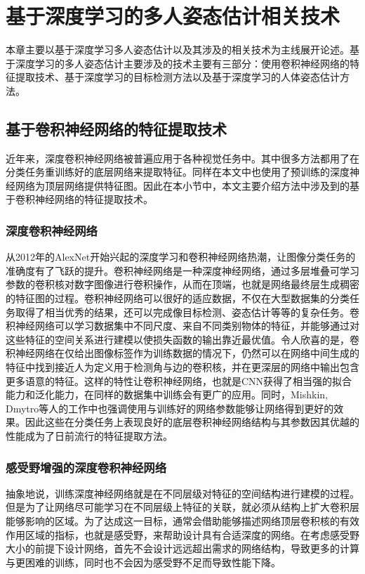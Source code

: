 \chapter{基于深度学习的多人姿态估计相关技术}
\label{cha:basicfacts}
本章主要以基于深度学习多人姿态估计以及其涉及的相关技术为主线展开论述。基于深度学习的多人姿态估计主要涉及的技术主要有三部分：使用卷积神经网络的特征提取技术、基于深度学习的目标检测方法以及基于深度学习的人体姿态估计方法。
\section{基于卷积神经网络的特征提取技术}
近年来，深度卷积神经网络被普遍应用于各种视觉任务中。其中很多方法都用了在分类任务重训练好的底层网络来提取特征。同样在本文中也使用了预训练的深度神经网络为顶层网络提供特征图。因此在本小节中，本文主要介绍方法中涉及到的基于卷积神经网络的特征提取技术。
\subsection{深度卷积神经网络}
\label{subsec:factsfeature}
从2012年的AlexNet\cite{alex2012alexnet}开始兴起的深度学习和卷积神经网络热潮，让图像分类任务的准确度有了飞跃的提升。卷积神经网络是一种深度神经网络，通过多层堆叠可学习参数的卷积核对数字图像进行卷积操作，从而在顶端，也就是网络最终层生成稠密的特征图的过程。卷积神经网络可以很好的适应数据，不仅在大型数据集的分类任务取得了相当优秀的结果，还可以完成像目标检测、姿态估计等等的复杂任务。卷积神经网络可以学习数据集中不同尺度、来自不同类别物体的特征，并能够通过对这些特征的空间关系进行建模以使损失函数的输出靠近最优值。令人欣喜的是，卷积神经网络在仅给出图像标签作为训练数据的情况下，仍然可以在网络中间生成的特征中找到接近人为定义用于检测角与边的卷积核，并在更深层的网络中输出包含更多语意的特征\cite{yosinski2015understanding}。这样的特性让卷积神经网络，也就是CNN获得了相当强的拟合能力和泛化能力，在同样的数据集中训练会有更广的应用。同时，Mishkin, Dmytro等人的工作中\cite{mishkin2015all}也强调使用与训练好的网络参数能够让网络得到更好的效果。因此这些在分类任务上表现良好的底层卷积神经网络结构与其参数因其优越的性能成为了日前流行的特征提取方法。
\subsection{感受野增强的深度卷积神经网络}
\label{subsec:factsdeepextract}
抽象地说，训练深度神经网络就是在不同层级对特征的空间结构进行建模的过程。但是为了让网络尽可能学习在不同层级上特征的关联，就必须从结构上扩大卷积层能够影响的区域。为了达成这一目标，通常会借助能够描述网络顶层卷积核的有效作用区域的指标，也就是感受野，来帮助设计具有合适深度的网络。在考虑感受野大小的前提下设计网络，首先不会设计远远超出需求的网络结构，导致更多的计算与更困难的训练，同时也不会因为感受野不足而导致性能下降。


